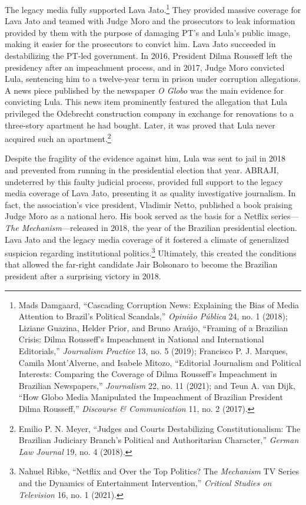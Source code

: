 \documentclass{tufte-handout}
\begin{document}
The legacy media fully supported Lava Jato.\footnote{Mads Damgaard,
  ``Cascading Corruption News: Explaining the Bias of Media Attention to
  Brazil's Political Scandals,'' \emph{Opinião Pública} 24, no. 1
  (2018); Liziane Guazina, Helder Prior, and Bruno Araújo, ``Framing of
  a Brazilian Crisis: Dilma Rousseff's Impeachment in National and
  International Editorials,'' \emph{Journalism Practice} 13, no. 5
  (2019); Francisco P. J. Marques, Camila Mont'Alverne, and Isabele
  Mitozo, ``Editorial Journalism and Political Interests: Comparing the
  Coverage of Dilma Rousseff's Impeachment in Brazilian Newspa­pers,''
  \emph{Journalism} 22, no. 11 (2021); and Teun A. van Dijk, ``How Globo
  Media Manipulated the Impeachment of Brazilian President Dilma
  Rousseff,'' \emph{Discourse \& Communication} 11, no. 2 (2017).} They
provided massive coverage for Lava Jato and teamed with Judge Moro and
the prosecutors to leak information provided by them with the purpose of
damaging PT's and Lula's public image, making it easier for the
prosecutors to convict him. Lava Jato succeeded in destabilizing the
PT-led government. In 2016, President Dilma Rousseff left the presidency
after an impeachment process, and in 2017, Judge Moro convicted Lula,
sentencing him to a twelve-year term in prison under corruption
allegations. A news piece published by the newspaper \emph{O Globo} was
the main evidence for convicting Lula. This news item prominently
featured the allegation that Lula privileged the Odebrecht construction
company in exchange for renovations to a three-story apartment he had
bought. Later, it was proved that Lula never acquired such an
apartment.\footnote{Emilio P. N. Meyer, ``Judges and Courts
  Destabilizing Constitutionalism: The Brazil­ian Judiciary Branch's
  Political and Authoritarian Character,'' \emph{German Law Journal} 19,
  no. 4 (2018).}

Despite the fragility of the evidence against him, Lula was sent to jail
in 2018 and prevented from running in the presidential election that
year. ABRAJI, undeterred by this faulty judicial process, provided full
support to the legacy media coverage of Lava Jato, presenting it as
quality investigative journalism. In fact, the association's vice
president, Vladimir Netto, published a book praising Judge Moro as a
national hero. His book served as the basis for a Netflix
series---\emph{The Mechanism}---released in 2018, the year of the
Brazilian presidential election. Lava Jato and the legacy media coverage
of it fostered a climate of generalized suspicion regarding
institutional politics.\footnote{Nahuel Ribke, ``Netflix and Over the
  Top Politics? The \emph{Mechanism} TV Series and the Dynamics of
  Entertainment Intervention,'' \emph{Critical Studies on Television}
  16, no. 1 (2021).} Ultimately, this created the conditions that
allowed the far-right candidate Jair Bolsonaro to become the Brazilian
president after a surprising victory in 2018.
\end{document}
